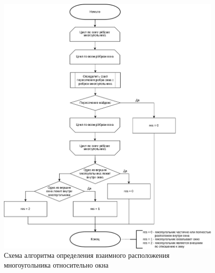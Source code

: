 \begin{figure}[h]
	\centering
	\includegraphics[width=\textwidth ]{img/flowchart/identification2.png}
	\caption{Схема алгоритма определения взаимного расположения многоугольника относительно окна}
	\label{fig:warnock_identification}
\end{figure} 


